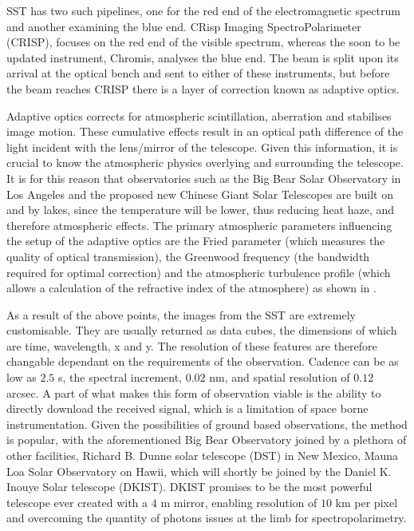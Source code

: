 SST has two such pipelines, one for the red end of the electromagnetic spectrum and another examining the blue end.
CRisp Imaging SpectroPolarimeter (CRISP), focuses on the red end of the visible spectrum, whereas the soon to be updated instrument, Chromis, analyses the blue end.
The beam is split upon its arrival at the optical bench and sent to either of these instruments, but before the beam reaches CRISP there is a layer of correction known as adaptive optics.

Adaptive optics corrects for atmospheric scintillation, aberration and stabilises image motion.
These cumulative effects result in an optical path difference of the light incident with the lens/mirror of the telescope.
Given this information, it is crucial to know the atmospheric physics overlying and surrounding the telescope.
It is for this reason that observatories such as the Big Bear Solar Observatory \citep{Cao2010} in Los Angeles and the proposed new Chinese Giant Solar Telescopes \citep{Liu2014} are built on and by lakes, since the temperature will be lower, thus reducing heat haze, and therefore atmospheric effects.
The primary atmospheric parameters influencing the setup of the adaptive optics are the Fried parameter (which measures the quality of optical transmission), the Greenwood frequency (the bandwidth required for optimal correction) and the atmospheric turbulence profile (which allows a calculation of the refractive index of the atmosphere) as shown in \cite{Rimmele2011}.

As a result of the above points, the images from the SST are extremely customisable.
They are usually returned as data cubes, the dimensions of which are time, wavelength, x and y.
The resolution of these features are therefore changable dependant on the requirements of the observation.
Cadence can be as low as $2.5$ s, the spectral increment, $0.02$ nm, and spatial resolution of $0.12$ arcsec.
A part of what makes this form of observation viable is the ability to directly download the received signal, which is a limitation of space borne instrumentation.
Given the possibilities of ground based observations, the method is popular, with the aforementioned Big Bear Observatory joined by a plethora of other facilities, Richard B. Dunne solar telescope (DST) in New Mexico, Mauna Loa Solar Observatory on Hawii, which will shortly be joined by the Daniel K. Inouye Solar telescope (DKIST).
DKIST promises to be the most powerful telescope ever created with a $4$ m mirror, enabling resolution of $10$ km per pixel and overcoming the quantity of photons issues at the limb for spectropolarimetry.



